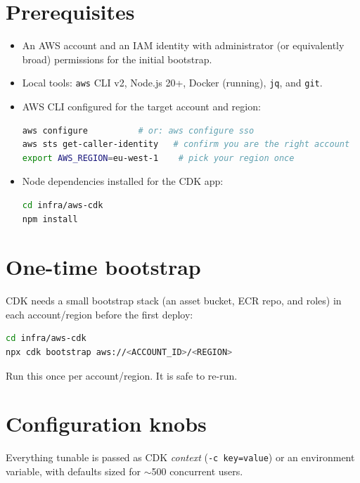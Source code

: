 \documentclass[11pt,a4paper]{article}
\begin{document}
\section{Prerequisites}

\begin{itemize}[leftmargin=1.4em]
  \item An AWS account and an IAM identity with administrator (or equivalently
        broad) permissions for the initial bootstrap.
  \item Local tools: \texttt{aws} CLI v2, Node.js 20+, Docker (running),
        \texttt{jq}, and \texttt{git}.
  \item AWS CLI configured for the target account and region:
\begin{lstlisting}[language=bash]
aws configure          # or: aws configure sso
aws sts get-caller-identity   # confirm you are the right account
export AWS_REGION=eu-west-1    # pick your region once
\end{lstlisting}
  \item Node dependencies installed for the CDK app:
\begin{lstlisting}[language=bash]
cd infra/aws-cdk
npm install
\end{lstlisting}
\end{itemize}

\section{One-time bootstrap}

CDK needs a small bootstrap stack (an asset bucket, ECR repo, and roles) in each
account/region before the first deploy:

\begin{lstlisting}[language=bash]
cd infra/aws-cdk
npx cdk bootstrap aws://<ACCOUNT_ID>/<REGION>
\end{lstlisting}

Run this once per account/region. It is safe to re-run.

\section{Configuration knobs}

Everything tunable is passed as CDK \emph{context} (\texttt{-c key=value}) or an
environment variable, with defaults sized for $\sim$500 concurrent users.
\end{document}
